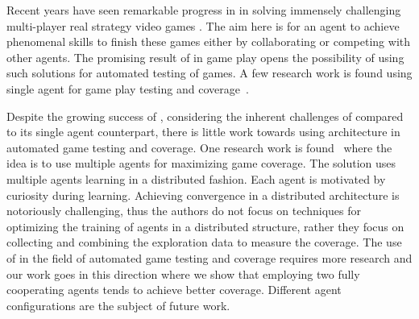 

Recent years have seen remarkable progress in \rlacronym in solving immensely challenging multi-player real strategy video games \cite{vinyals2019grandmasterStarCraft,zhou2021hierarchical,OpenAIHideandSeekbaker2019,silver2017masteringGo}. The aim here is for an agent to achieve phenomenal skills to finish these games either by collaborating or competing with other agents. 
The promising result of \rlacronym in game play opens the possibility of using such solutions for automated testing of games. A few research work is found using single agent \rlacronym for game play testing and coverage~\cite{bergdahl2020augmenting, sestini2022automated, zheng2019wuji, holmgaard2018automated, ariyurek2019automated, tufano2022using, borovikov2019winning}.

Despite the growing success of \marlacronym, considering the inherent challenges of \marlacronym compared to its single agent counterpart, there is little work towards using \marlacronym architecture in automated game testing and coverage. 
One research work is found~\cite{gordillo2021improving}  
where the idea is to use multiple agents for maximizing game coverage. The solution uses multiple \rlacronym agents learning in a distributed fashion. Each agent is motivated by curiosity during learning. Achieving convergence in a distributed \marlacronym architecture is notoriously challenging, thus the authors do not focus on techniques for optimizing the training of agents in a distributed structure, rather they focus on collecting and combining the exploration data to measure the coverage. 
The use of \marlacronym in the field of automated game testing and coverage requires more research and our work goes in this direction where we show that employing two fully cooperating agents tends to achieve better coverage. Different agent configurations are the subject of future work.